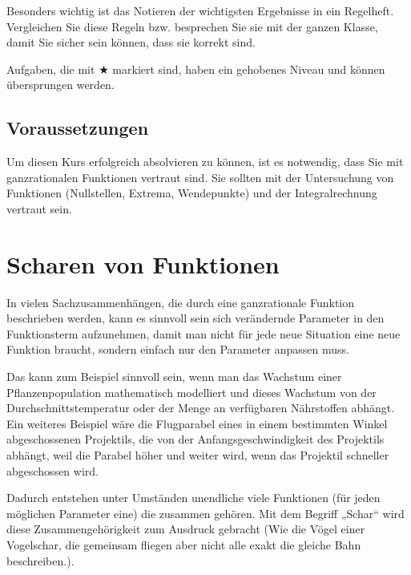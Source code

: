 \documentclass[11pt,a4paper,twoside,fleqn]{article}
\begin{document}
Besonders wichtig ist das Notieren der wichtigsten Ergebnisse in ein
Regelheft. Vergleichen Sie diese Regeln bzw. besprechen Sie sie mit
der ganzen Klasse, damit Sie sicher sein können, dass sie korrekt
sind.

Aufgaben, die mit $\bigstar$ markiert sind, haben ein gehobenes Niveau
und können übersprungen werden.

\subsection*{Voraussetzungen}
Um diesen Kurs erfolgreich absolvieren zu können, ist es notwendig,
dass Sie mit ganzrationalen Funktionen vertraut sind. Sie sollten mit
der Untersuchung von Funktionen (Nullstellen, Extrema, Wendepunkte)
und der Integralrechnung vertraut sein. 
\tableofcontents

\section{Scharen von Funktionen}
In vielen Sachzusammenhängen, die durch eine ganzrationale Funktion
beschrieben werden, kann es sinnvoll sein sich verändernde Parameter
in den Funktionsterm aufzunehmen, damit man nicht für jede neue
Situation eine neue Funktion braucht, sondern einfach nur den
Parameter anpassen muss.

Das kann zum Beispiel sinnvoll sein, wenn man das Wachstum einer
Pflanzenpopulation mathematisch modelliert und dieses Wachstum von
der Durchschnittstemperatur oder der Menge an verfügbaren Nährstoffen
abhängt. \\
Ein weiteres Beispiel wäre die Flugparabel eines in einem bestimmten
Winkel abgeschossenen Projektils, die von der Anfangsgeschwindigkeit
des Projektils abhängt, weil die Parabel höher und weiter wird, wenn
das Projektil schneller abgeschossen wird.

Dadurch entstehen unter Umständen unendliche viele Funktionen (für
jeden möglichen Parameter eine) die zusammen gehören. Mit dem Begriff
„Schar“ wird diese Zusammengehörigkeit zum Ausdruck gebracht (Wie die
Vögel einer Vogelschar, die gemeinsam fliegen aber nicht alle exakt
die gleiche Bahn beschreiben.).
\end{document}
